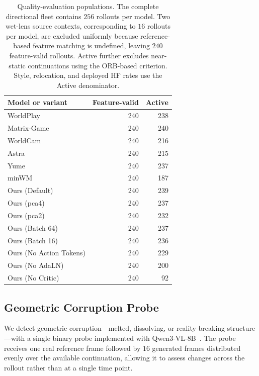 \documentclass[letterpaper]{article} %
\begin{document}
\begin{table}[t]
\centering
{
\small
\begin{tabular}{lrr}
\toprule
Model or variant & Feature-valid & Active \\
\midrule
WorldPlay              & 240 & 238 \\
Matrix-Game            & 240 & 240 \\
WorldCam               & 240 & 216 \\
Astra                  & 240 & 215 \\
Yume                   & 240 & 237 \\
minWM                  & 240 & 187 \\
\midrule
Ours (Default)         & 240 & 239 \\
Ours (pca4)            & 240 & 237 \\
Ours (pca2)            & 240 & 232 \\
Ours (Batch 64)        & 240 & 237 \\
Ours (Batch 16)        & 240 & 236 \\
Ours (No Action Tokens)& 240 & 229 \\
Ours (No AdaLN)        & 240 & 200 \\
Ours (No Critic)       & 240 & 92  \\
\bottomrule
\end{tabular}
}
\caption{
    Quality-evaluation populations. The complete directional fleet contains
    $256$ rollouts per model. Two wet-lens source contexts, corresponding to
    $16$ rollouts per model, are excluded uniformly because reference-based
    feature matching is undefined, leaving $240$ feature-valid rollouts.
    Active further excludes near-static continuations using the ORB-based
    criterion. Style, relocation, and deployed HF rates use the Active
    denominator.
}
\label{tab:quality_denominators}
\end{table}


\subsection{Geometric Corruption Probe}
\label{app:vlm_quality_probes}

We detect geometric corruption---melted, dissolving, or reality-breaking
structure---with a single binary probe implemented with Qwen3-VL-8B~\cite{QWEN}.
The probe receives one real reference frame followed by $16$ generated frames
distributed evenly over the available continuation, allowing it to assess
changes across the rollout rather than at a single time point.
\end{document}
